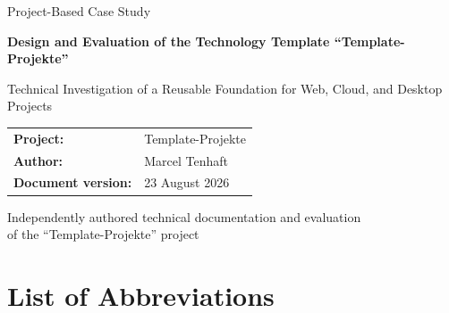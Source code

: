 \documentclass[11pt,a4paper]{article}
\newcommand{\arbeitstitel}{Design and Evaluation of the
  Technology Template \enquote{Template-Projekte}}
\newcommand{\arbeituntertitel}{Technical Investigation of a
  Reusable Foundation for Web, Cloud, and Desktop Projects}
\newcommand{\arbeitart}{Project-Based Case Study}
\newcommand{\projektname}{Template-Projekte}
\newcommand{\autorname}{Marcel Tenhaft}
\newcommand{\dokumentstand}{23 August 2026}
\begin{document}
\hypersetup{pageanchor=false}
\thispagestyle{empty}

\begin{titlepage}
  \centering

  {\Large \arbeitart \par}
  \vspace{1.8cm}

  {\bfseries\LARGE \arbeitstitel \par}
  \vspace{0.6cm}

  {\large \arbeituntertitel \par}
  \vspace{2.5cm}

  \begin{tabularx}{0.82\textwidth}{@{}lX@{}}
    \textbf{Project:}          & \projektname \\
    \textbf{Author:}           & \autorname \\
    \textbf{Document version:} & \dokumentstand \\
  \end{tabularx}

  \vfill

  {\small
  Independently authored technical documentation and evaluation\\
  of the \enquote{\projektname} project
  \par}
\end{titlepage}

\hypersetup{pageanchor=true}
\setcounter{page}{1}

\clearpage
\tableofcontents

\clearpage
\renewcommand{\listfigurename}{List of Figures}
{}
\listoffigures

\clearpage
\renewcommand{\listtablename}{List of Tables}
{}
\listoftables

\clearpage
{}
\section*{List of Abbreviations}
\end{document}

